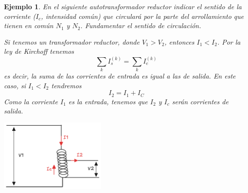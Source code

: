 \documentclass[11pt]{report}
\newtheorem{example}{Ejemplo}[section]
\begin{document}
    \begin{example}
        En el siguiente autotransformador reductor indicar el sentido de la corriente ($I_c$, intensidad común) que circulará por la parte del arrollamiento que tienen en común $N_1$ y $N_2$. Fundamentar el sentido de circulación.

        Si tenemos un transformador reductor, donde $V_1 > V_2$, entonces $I_1 < I_2$. Por la ley de Kirchoff tenemos 
        \begin{equation}
            \sum_k I_s^{(k)} = \sum_k I_e^{(k)}
        \end{equation}
        es decir, la suma de las corrientes de entrada es igual a las de salida. En este caso, si $I_1 < I_2$ tendremos 
        \begin{equation}
            I_2 = I_1 + I_C
        \end{equation}
        Como la corriente $I_1$ es la entrada, tenemos que $I_2$ y $I_c$ serán corrientes de salida.
        \begin{center}
            \includegraphics[width=200px]{ejemplo2.png}
        \end{center}
    \end{example}
\end{document}
